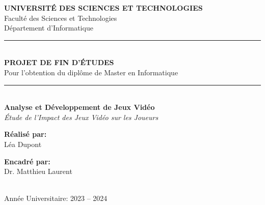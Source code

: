 \documentclass[12pt,a4paper]{report}
\begin{document}
\begin{titlepage}
    \centering
    
    {\Large\textbf{UNIVERSITÉ DES SCIENCES ET TECHNOLOGIES}}\\[0.3cm]
    {\large Faculté des Sciences et Technologies}\\[0.3cm]
    {\large Département d'Informatique}\\[1.5cm]
    
    \rule{\linewidth}{0.5mm}\\[0.4cm]
    {\Huge\textbf{\textcolor{maincolor}{PROJET DE FIN D'ÉTUDES}}}\\[0.2cm]
    {\large Pour l'obtention du diplôme de Master en Informatique}\\
    \rule{\linewidth}{0.5mm}\\[1.5cm]
    
    {\LARGE\textbf{Analyse et Développement de Jeux Vidéo}}\\[0.3cm]
    {\Large\textit{Étude de l'Impact des Jeux Vidéo sur les Joueurs}}\\[2cm]
    
    \begin{minipage}{0.45\textwidth}
        \begin{flushleft}
            \textbf{Réalisé par:}\\
            Léa Dupont
        \end{flushleft}
    \end{minipage}
    \hfill
    \begin{minipage}{0.45\textwidth}
        \begin{flushright}
            \textbf{Encadré par:}\\
            Dr. Matthieu Laurent
        \end{flushright}
    \end{minipage}\\[2cm]
    
    {\large Année Universitaire: 2023 -- 2024}
    
\end{titlepage}
\end{document}
